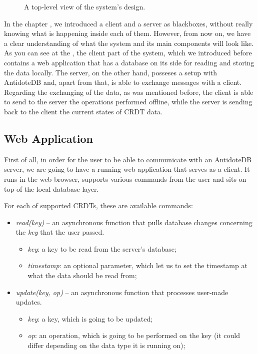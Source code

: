 \begin{figure}[!htb]
    \begin{center}
        \setlength{\fboxsep}{15pt}%
        \setlength{\fboxrule}{1pt}%
    \def\svgwidth{\linewidth}
    \fbox{}
    \caption {A top-level view of the system's design.}
    \label{fig:impl1}
\end{center}
\end{figure}

In the chapter , we introduced a client and a server as blackboxes, without really knowing what is happening inside each of them. However, from now on, we have a clear understanding of what the system and its main components will look like. As you can see at the , the client part of the system, which we introduced before contains a web application that has a database on its side for reading and storing the data locally. The server, on the other hand, posseses a setup with AntidoteDB and, apart from that, is able to exchange messages with a client. Regarding the exchanging of the data, as was mentioned before, the client is able to send to the server the operations performed offline, while the server is sending back to the client the current states of CRDT data.


\subsection{Web Application}

First of all, in order for the user to be able to communicate with an AntidoteDB server, we are going to have a running web application that serves as a client. It runs in the web-browser, supports various commands from the user and sits on top of the local database layer. 

\vspace{5mm}For each of supported CRDTs, these are available commands:

\begin{itemize}
    \item \textit{read(key)} -- an asynchronous function that pulls database changes concerning the \textit{key} that the user passed.
         \begin{itemize}
         \item \textit{key}: a key to be read from the server's database;
         \item \textit{timestamp}: an optional parameter, which let us to set the timestamp at what the data should be read from;
     \end{itemize}
    \item \textit{update(key, op)}  -- an asynchronous function that processes user-made updates.
     \begin{itemize}
         \item \textit{key}: a key, which is going to be updated;
         \item \textit{op}: an operation, which is going to be performed on the key (it could differ depending on the data type it is running on);
     \end{itemize}
  \end{itemize}
  
